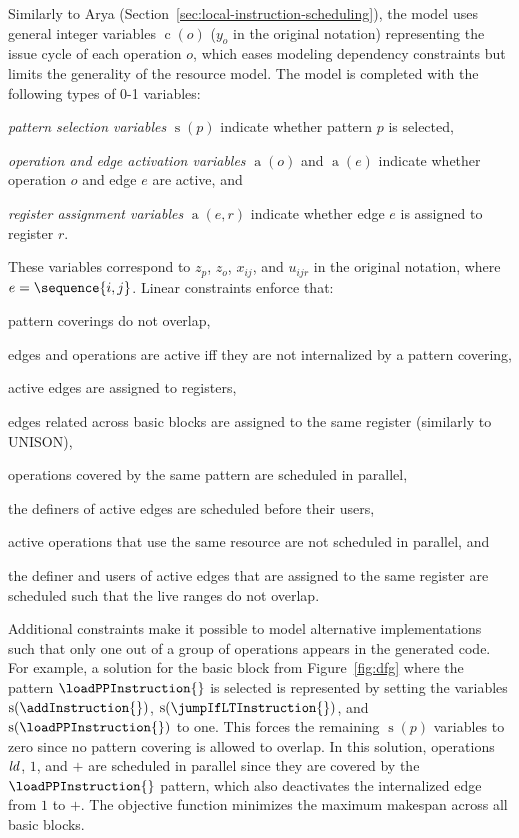\documentclass[acmsmall,authorversion,nonacm]{acmart}
\newcommand{\noMathVar}[2]{\operatorname{#1}(#2)}
\newcommand{\var}[2]{$\noMathVar{#1}{#2}$}
\begin{document}
Similarly to Arya (Section~\ref{sec:local-instruction-scheduling}),
the model uses general integer variables \var{c}{o} ($y_o$ in the
original notation) representing the issue cycle of each operation $o$,
which eases modeling dependency constraints but limits the generality
of the resource model.
The model is completed with the following types of 0-1 variables:
\begin{inparaitem}[]
\item \emph{pattern selection variables} \var{s}{p} indicate whether
  pattern $p$ is selected,
\item \emph{operation and edge activation variables} \var{a}{o} and
  \var{a}{e} indicate whether operation $o$ and edge $e$ are active,
  and
\item \emph{register assignment variables} \var{a}{e,r}
  indicate whether edge $e$ is assigned to register $r$.
\end{inparaitem}
These variables correspond to $z_p$, $z_o$, $x_{ij}$, and $u_{ijr}$
in the original notation, where $e = \sequence{i,j}$.
Linear constraints enforce that:
\begin{inparaitem}[]
\item pattern coverings do not overlap,
\item edges and operations are active iff they are not internalized by
  a pattern covering,
\item active edges are assigned to registers,
\item edges related across basic blocks are assigned to the same
  register (similarly to UNISON),
\item operations covered by the same pattern are scheduled in
  parallel,
\item the definers of active edges are scheduled before their users,
\item active operations that use the same resource are not scheduled
  in parallel, and
\item the definer and users of active edges that are assigned to the
  same register are scheduled such that the live ranges do not
  overlap.
\end{inparaitem}
Additional constraints make it possible to model alternative
implementations such that only one out of a group of operations
appears in the generated code.
For example, a solution for the basic block from Figure~\ref{fig:dfg}
where the pattern $\loadPPInstruction{}$ is selected is represented by
setting the variables \var{s}{\addInstruction{}},
\var{s}{\jumpIfLTInstruction{}}, and \var{s}{\loadPPInstruction{}} to
one.
This forces the remaining \var{s}{p} variables to zero since no
pattern covering is allowed to overlap.
In this solution, operations $\textrm{{\emph{ld}}}$, $1$, and $+$ are
scheduled in parallel since they are covered by the
$\loadPPInstruction{}$ pattern, which also deactivates the
internalized edge from $1$ to $+$.
The objective function minimizes the maximum makespan across all basic
blocks.
\end{document}
